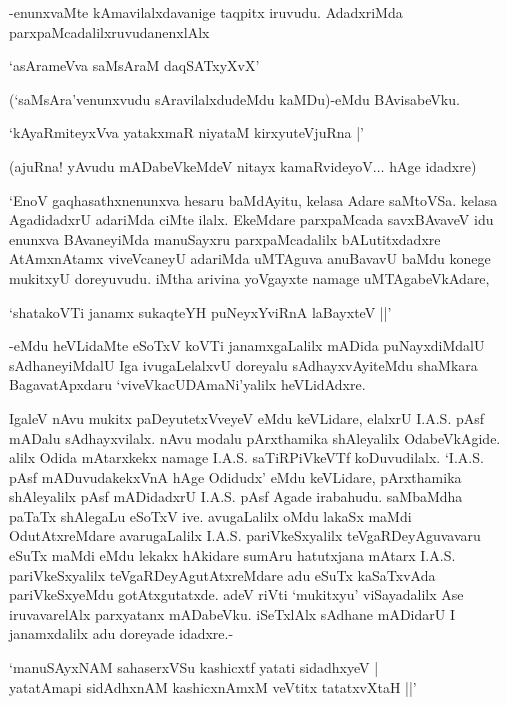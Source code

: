 -enunxvaMte kAmavilalxdavanige taqpitx iruvudu. AdadxriMda parxpaMcadalilxruvudanenxlAlx

\begin{shloka}
`asArameVva saMsAraM daqSATxyXvX'
\end{shloka}

(`saMsAra'venunxvudu sAravilalxdudeMdu kaMDu)-eMdu BAvisabeVku.

\begin{shloka}
`kAyaRmiteyxVva yatakxmaR niyataM kirxyuteV\s juRna |'
\end{shloka}

(ajuRna! yAvudu mADabeVkeMdeV nitayx kamaRvideyoV$\ldots$ hAge idadxre)

`EnoV gaqhasathxnenunxva hesaru baMdAyitu, kelasa Adare saMtoVSa. kelasa AgadidadxrU adariMda ciMte ilalx. EkeMdare parxpaMcada savxBAvaveV idu enunxva BAvaneyiMda manuSayxru parxpaMcadalilx bALutitxdadxre AtAmxnAtamx viveVcaneyU adariMda uMTAguva anuBavavU baMdu konege mukitxyU doreyuvudu. iMtha arivina yoVgayxte namage uMTAgabeVkAdare,

\begin{shloka}
`shatakoVTi janamx sukaqteYH puNeyxYviRnA laBayxteV ||'
\end{shloka}

-eMdu heVLidaMte eSoTxV koVTi janamxgaLalilx mADida puNayxdiMdalU sAdhaneyiMdalU Iga ivugaLelalxvU doreyalu sAdhayxvAyiteMdu shaMkara BagavatApxdaru `viveVkacUDAmaNi'yalilx heVLidAdxre.

IgaleV nAvu mukitx paDeyutetxVveyeV eMdu keVLidare, elalxrU {\eng I.A.S.} pAsf mADalu sAdhayxvilalx. nAvu modalu pArxthamika shAleyalilx OdabeVkAgide. alilx Odida mAtarxkekx namage {\eng I.A.S.} saTiRPiVkeVTf koDuvudilalx. `{\eng I.A.S.} pAsf mADuvudakekxVnA hAge Odidudx' eMdu keVLidare, pArxthamika shAleyalilx pAsf mADidadxrU {\eng I.A.S.} pAsf Agade irabahudu. saMbaMdha paTaTx shAlegaLu eSoTxV ive. avugaLalilx oMdu lakaSx maMdi OdutAtxreMdare avarugaLalilx {\eng I.A.S.} pariVkeSxyalilx teVgaRDeyAguvavaru eSuTx maMdi eMdu lekakx hAkidare sumAru hatutxjana mAtarx {\eng I.A.S.} pariVkeSxyalilx teVgaRDeyAgutAtxreMdare adu eSuTx kaSaTxvAda pariVkeSxyeMdu gotAtxgutatxde. adeV riVti `mukitxyu' viSayadalilx Ase iruvavarelAlx parxyatanx mADabeVku. iSeTxlAlx sAdhane mADidarU I janamxdalilx adu doreyade idadxre.-

\begin{shloka}
`manuSAyxNAM sahaserxVSu kashicxtf yatati sidadhxyeV |\\
yatatAmapi sidAdhxnAM kashicxnAmxM veVtitx tatatxvXtaH ||'
\end{shloka}

